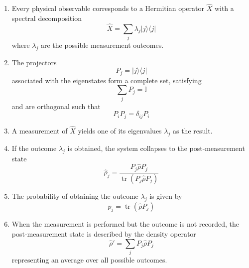 \begin{enumerate}
    \item Every physical observable corresponds to a Hermitian operator $\hat{X}$ with a spectral decomposition
    \begin{equation}
        \hat{X} = \sum_j \lambda_j |j\rangle\langle j|
    \end{equation}
    where $\lambda_j$ are the possible measurement outcomes.

    \item The projectors 
    \begin{equation}
        P_j = |j\rangle\langle j|
    \end{equation}
     associated with the eigenstates form a complete set, satisfying 
     \begin{equation}
         \sum_j P_j = \mathbb{I}
     \end{equation} and are orthogonal such that 
     \begin{equation}
         P_i P_j = \delta_{ij} P_i
     \end{equation}
     
    \item A measurement of $\hat{X}$ yields one of its eigenvalues $\lambda_j$ as the result.

    \item If the outcome $\lambda_j$ is obtained, the system collapses to the post-measurement state 
    \begin{equation}
        \hat{\rho}_j = \frac{P_j \hat{\rho} P_j}{\operatorname{tr}(P_j \hat{\rho} P_j)}
    \end{equation}

    \item The probability of obtaining the outcome $\lambda_j$ is given by 
    \begin{equation}
    p_j = \operatorname{tr}(\hat{\rho} P_j)    
    \end{equation}
    
    \item When the measurement is performed but the outcome is not recorded, the post-measurement state is described by the density operator 
    \begin{equation}
        \hat{\rho}' = \sum_j P_j \hat{\rho} P_j
    \end{equation}
     representing an average over all possible outcomes.
\end{enumerate}

